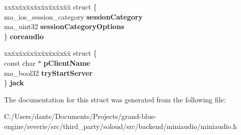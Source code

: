 \begin{DoxyCompactItemize}
\begin{tabbing}
\end{tabbing}\item 
\mbox{\label{structma__context__config_a1ffee2e1eafade6831c18e8722044356}} 
\begin{tabbing}
xx\=xx\=xx\=xx\=xx\=xx\=xx\=xx\=xx\=\kill
struct \{\\
\>ma\_ios\_session\_category {\bfseries sessionCategory}\\
\>ma\_uint32 {\bfseries sessionCategoryOptions}\\
\} {\bfseries coreaudio}\\

\end{tabbing}\item 
\mbox{\label{structma__context__config_ad42794a6272aec820e029d87a4ae5b76}} 
\begin{tabbing}
xx\=xx\=xx\=xx\=xx\=xx\=xx\=xx\=xx\=\kill
struct \{\\
\>const char $\ast$ {\bfseries pClientName}\\
\>ma\_bool32 {\bfseries tryStartServer}\\
\} {\bfseries jack}\\

\end{tabbing}\end{DoxyCompactItemize}


The documentation for this struct was generated from the following file\+:\begin{DoxyCompactItemize}
\item 
C\+:/\+Users/dante/\+Documents/\+Projects/grand-\/blue-\/engine/reverie/src/third\+\_\+party/soloud/src/backend/miniaudio/miniaudio.\+h\end{DoxyCompactItemize}
